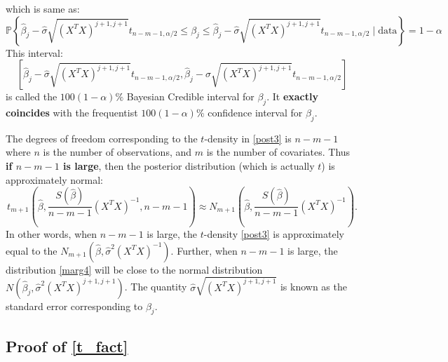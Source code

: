 \documentclass{scrartcl}
\renewcommand{\P}{{\mathbb P}}
\begin{document}
which is same as:
\begin{equation*}
  \P \left\{\hat{\beta}_j - \hat{\sigma} \sqrt{(X^T X)^{j+1,
          j+1}} t_{n-m-1, \alpha/2} \leq \beta_j \leq \hat{\beta}_j - \hat{\sigma} \sqrt{(X^T X)^{j+1,
          j+1}} t_{n-m-1, \alpha/2}  \mid \text{data}  \right\} = 1 -
    \alpha 
\end{equation*}
This interval:
\begin{equation*}
  \left[\hat{\beta}_j - \hat{\sigma} \sqrt{(X^T X)^{j+1,
          j+1}} t_{n-m-1, \alpha/2},  \hat{\beta}_j - \hat{\sigma} \sqrt{(X^T X)^{j+1,
          j+1}} t_{n-m-1, \alpha/2} \right]
  \end{equation*}
  is called the $100(1-\alpha)\%$ Bayesian Credible interval for
  $\beta_j$. It \textbf{exactly coincides} with the frequentist $100(1
  - \alpha)\%$ confidence interval for $\beta_j$.

The degrees of freedom corresponding to the $t$-density in \eqref{post3} is $n - m - 1$ where
$n$ is the number of observations, and $m$ is the number of
covariates. Thus \textbf{if $n-m-1$ is large}, then the posterior
distribution (which is actually $t$) is approximately normal: 
\begin{equation*}
    t_{m+1}\left(\hat{\beta},\frac{S(\hat{\beta})}{n - m - 1} \left(X^T
      X 
  \right)^{-1}, n - m - 1 \right) \approx N_{m+1}(\hat{\beta},
\frac{S(\hat{\beta})}{n - m - 1} \left(X^T X  \right)^{-1}).  
\end{equation*}
In other words, when $n-m-1$ is large, the $t$-density \eqref{post3} is approximately
equal to the $N_{m+1}(\hat{\beta}, \hat{\sigma}^2 (X^T
X)^{-1})$. Further, when $n-m-1$ is large, the distribution \eqref{marg4}
will be close to the normal  distribution $N(\hat{\beta}_j,
\hat{\sigma}^2 (X^T X)^{j+1, j+1})$. The quantity $\hat{\sigma}
\sqrt{(X^T X)^{j+1, j+1}}$ is known as the standard error
corresponding to $\beta_j$.  



\subsection{Proof of \eqref{t_fact}}\label{proof_t_norm}
\end{document}

